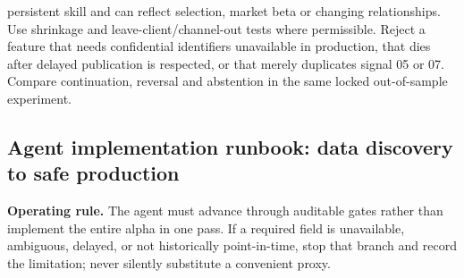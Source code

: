 \documentclass[10pt]{article}
\begin{document}
persistent skill and can reflect selection, market beta or changing relationships. Use shrinkage and leave-client/channel-out tests where permissible. Reject a feature that needs confidential identifiers unavailable in production, that dies after delayed publication is respected, or that merely duplicates signal 05 or 07. Compare continuation, reversal and abstention in the same locked out-of-sample experiment.
\subsection{Agent implementation runbook: data discovery to safe production}
\textbf{Operating rule.} The agent must advance through auditable gates rather than implement the entire alpha in one pass. If a required field is unavailable, ambiguous, delayed, or not historically point-in-time, stop that branch and record the limitation; never silently substitute a convenient proxy.
\end{document}
